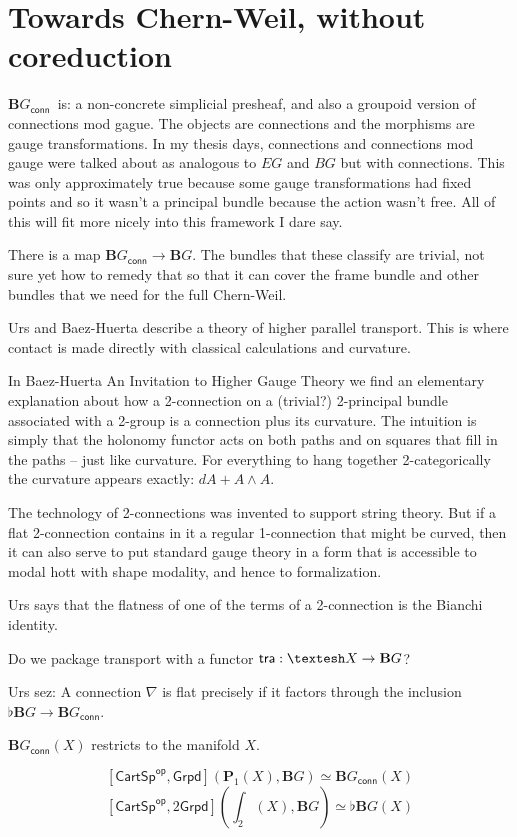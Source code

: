 \documentclass[12pt]{article}
\newcommand{\cart}{\textsf{CartSp}}
\newcommand{\shape}{\ensuremath{\text{\textesh}}}
\newcommand{\op}[1]{#1^{\textsf{op}}}
\newcommand{\bg}{\ensuremath{\textbf{B}G}}
\newcommand{\bgconn}{\ensuremath{\textbf{B}G_{\textsf{conn}}}}
\begin{document}
\section{Towards Chern-Weil, without coreduction}
\bgconn\ is: a non-concrete simplicial presheaf, and also a groupoid version of connections mod gague. The objects are connections and the morphisms are gauge transformations. In my thesis days, connections and connections mod gauge were talked about as analogous to $EG$ and $BG$ but with connections. This was only approximately true because some gauge transformations had fixed points and so it wasn't a principal bundle because the action wasn't free. All of this will fit more nicely into this framework I dare say.

There is a map $\bgconn\to\bg$. The bundles that these classify are trivial, not sure yet how to remedy that so that it can cover the frame bundle and other bundles that we need for the full Chern-Weil.

Urs and Baez-Huerta describe a theory of higher parallel transport. This is where contact is made directly with classical calculations and curvature.

In Baez-Huerta An Invitation to Higher Gauge Theory we find an elementary explanation about how a 2-connection on a (trivial?) 2-principal bundle associated with a 2-group is a connection plus its curvature. The intuition is simply that the holonomy functor acts on both paths and on squares that fill in the paths -- just like curvature. For everything to hang together 2-categorically the curvature appears exactly: $dA + A\wedge A$.

The technology of 2-connections was invented to support string theory. But if a flat 2-connection contains in it a regular 1-connection that might be curved, then it can also serve to put standard gauge theory in a form that is accessible to modal hott with shape modality, and hence to formalization.

Urs says that the flatness of one of the terms of a 2-connection is the Bianchi identity.

Do we package transport with a functor $\mathsf{tra}:\shape X\to \bg$?

Urs sez: A connection $\nabla$ is flat precisely if it factors through the inclusion $\flat \bg \to \bgconn$.

$\bgconn(X)$ restricts to the manifold $X$.

$$\left[ \op{\cart}, \mathsf{Grpd} \right](\textbf{P}_1(X), \bg) \simeq \bgconn(X)$$
$$\left[ \op{\cart}, 2\mathsf{Grpd} \right](\textstyle\int_2(X), \bg) \simeq \flat\bg(X)$$
\end{document}
